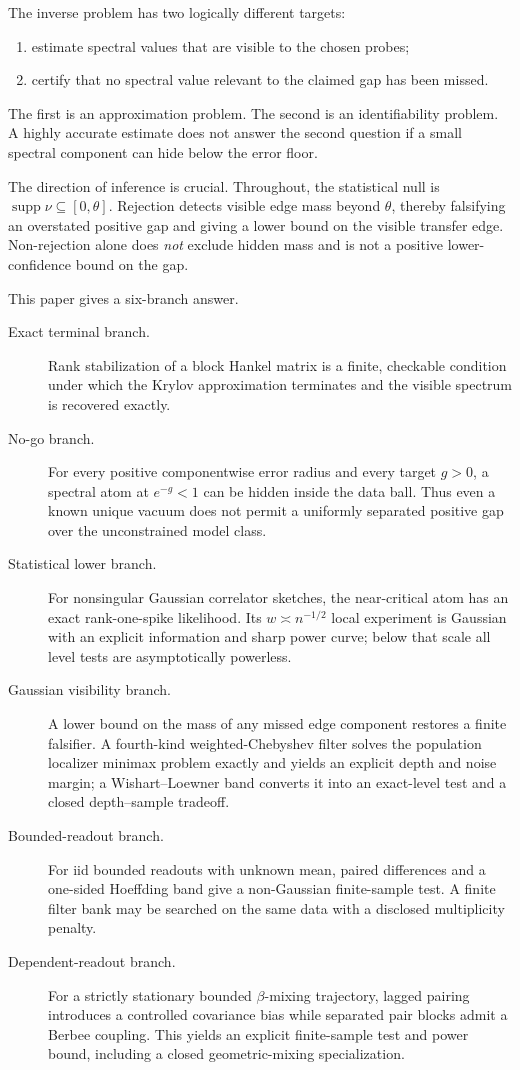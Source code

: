 \documentclass[11pt]{article}
\theoremstyle{definition}
\theoremstyle{remark}
\newcommand{\supp}{\operatorname{supp}}
\begin{document}
The inverse problem has two logically different targets:
\begin{enumerate}[label=(\roman*)]
  \item estimate spectral values that are visible to the chosen probes;
  \item certify that no spectral value relevant to the claimed gap has been
  missed.
\end{enumerate}
The first is an approximation problem.  The second is an identifiability
problem.  A highly accurate estimate does not answer the second question if a
small spectral component can hide below the error floor.

The direction of inference is crucial.  Throughout, the statistical null is
$\supp\nu\subseteq[0,\theta]$.  Rejection detects visible edge mass beyond
$\theta$, thereby falsifying an overstated positive gap and giving a lower
bound on the visible transfer edge.  Non-rejection alone does \emph{not}
exclude hidden mass and is not a positive lower-confidence bound on the gap.

This paper gives a six-branch answer.
\begin{description}
\item[Exact terminal branch.]
Rank stabilization of a block Hankel matrix is a finite, checkable condition
under which the Krylov approximation terminates and the visible spectrum is
recovered exactly.
\item[No-go branch.]
For every positive componentwise error radius and every target $g>0$, a
spectral atom at $e^{-g}<1$ can be hidden inside the data ball.  Thus even a
known unique vacuum does not permit a uniformly separated positive gap over the
unconstrained model class.
\item[Statistical lower branch.]
For nonsingular Gaussian correlator sketches, the near-critical atom has an
exact rank-one-spike likelihood.  Its $w\asymp n^{-1/2}$ local experiment is
Gaussian with an explicit information and sharp power curve; below that scale
all level tests are asymptotically powerless.
\item[Gaussian visibility branch.]
A lower bound on the mass of any missed edge component restores a finite
falsifier.  A fourth-kind weighted-Chebyshev filter solves the population
localizer minimax problem exactly and yields an explicit depth and noise
margin; a Wishart--Loewner band converts it into an exact-level test and a
closed depth--sample tradeoff.
\item[Bounded-readout branch.]
For iid bounded readouts with unknown mean, paired differences and a one-sided
Hoeffding band give a non-Gaussian finite-sample test.  A finite filter bank may
be searched on the same data with a disclosed multiplicity penalty.
\item[Dependent-readout branch.]
For a strictly stationary bounded $\beta$-mixing trajectory, lagged pairing
introduces a controlled covariance bias while separated pair blocks admit a
Berbee coupling.  This yields an explicit finite-sample test and power bound,
including a closed geometric-mixing specialization.
\end{description}
\end{document}
